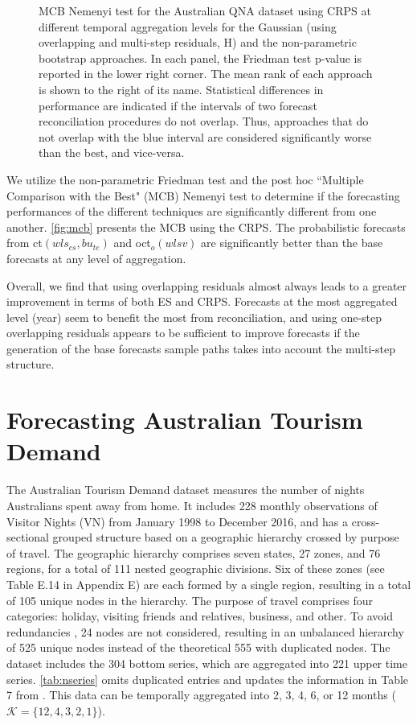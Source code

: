 \documentclass[12pt]{article}
\theoremstyle{definition}
\begin{document}
\begin{figure}[p]
	\caption{MCB Nemenyi test for the Australian QNA dataset using CRPS at different temporal aggregation levels for the Gaussian (using overlapping and multi-step residuals, H) and the non-parametric bootstrap approaches. In each panel, the Friedman test p-value is reported in the lower right corner. The mean rank of each approach is shown to the right of its name. Statistical differences in performance are indicated if the intervals of two forecast reconciliation procedures do not overlap. Thus, approaches that do not overlap with the blue interval are considered significantly worse than the best, and vice-versa.}
	\label{fig:mcb}
\end{figure}

We utilize the non-parametric Friedman test and the post hoc “Multiple Comparison with the Best" (MCB) Nemenyi test \citep{koning2005, kourentzes2019, makridakis2022} to determine if the forecasting performances of the different techniques are significantly different from one another.
\autoref{fig:mcb} presents the MCB using the CRPS. The probabilistic forecasts from ct$(wls_{cs},bu_{te})$ and oct$_o(wlsv)$ are significantly better than the base forecasts at any level of aggregation.

Overall, we find that using overlapping residuals almost always leads to a greater improvement in terms of both ES and CRPS. %
Forecasts at the most aggregated level (year) seem to benefit the most from reconciliation, and using one-step overlapping residuals appears to be sufficient to improve forecasts if the generation of the base forecasts sample paths takes into account the multi-step structure.



\section{Forecasting Australian Tourism Demand}\label{sec:vn525}

The Australian Tourism Demand dataset \citep{wickramasuriya2019} measures the number of nights Australians spent away from home. It includes 228 monthly observations of Visitor Nights (VN) from January 1998 to December 2016, and has a cross-sectional grouped structure based on a geographic hierarchy crossed by purpose of travel. The geographic hierarchy comprises seven states, 27 zones, and 76 regions, for a total of 111 nested geographic divisions. Six of these zones (see Table E.14 in Appendix E) are each formed by a single region, resulting in a total of 105 unique nodes in the hierarchy. The purpose of travel comprises four categories: holiday, visiting friends and relatives, business, and other.
To avoid redundancies \citep{difonzo2022a}, 24 nodes are not considered, resulting in an unbalanced hierarchy of 525 unique nodes instead of the theoretical 555 with duplicated nodes.
The dataset includes the 304 bottom series, which are aggregated into 221 upper time series. \autoref{tab:nseries} omits duplicated entries and updates the information in Table 7 from \cite{wickramasuriya2019}. This data can be temporally aggregated into 2, 3, 4, 6, or 12 months ($\mathcal{K} = \{12,4,3,2,1\}$).
\end{document}
